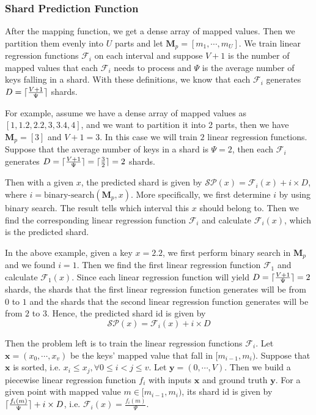 \subsubsection{Shard Prediction Function}

After the mapping function, we get a dense array of mapped values. Then we partition them evenly into $U$ parts and let $\boldsymbol{M}_p=[m_1,\cdots, m_U]$. We train linear regression functions $\mathcal{F}_i$ on each interval and suppose $V+1$ is the number of mapped values that each $\mathcal{F}_i$ needs to process and $\Psi$ is the average number of keys falling in a shard. With these definitions, we know that each $\mathcal{F}_i$ generates $D=\lceil\frac{V+1}{\Psi}\rceil$ shards.

For example, assume we have a dense array of mapped values as $[1,1.2,2.2,3,3.4,4]$, and we want to partition it into 2 parts, then we have $\boldsymbol{M}_p=[3]$ and $V+1=3$. In this case we will train $2$ linear regression functions. Suppose that the average number of keys in a shard is $\Psi=2$, then each $\mathcal{F}_i$ generates $D=\lceil\frac{V+1}{\Psi}\rceil=\lceil\frac{3}{2}\rceil=2$ shards.

Then with a given $x$, the predicted shard is given by $\mathcal{SP}(x)=\mathcal{F}_i(x)+i\times D$, where $i=\text{binary-search}(\boldsymbol{M}_p,x)$. More specifically, we first determine $i$ by using binary search. The result tells which interval this $x$ should belong to. Then we find the corresponding linear regression function $\mathcal{F}_i$ and calculate $\mathcal{F}_i(x)$, which is the predicted shard.

In the above example, given a key $x=2.2$, we first perform binary search in $\boldsymbol{M}_p$ and we found $i=1$. Then we find the first linear regression function $\mathcal{F}_1$ and calculate $\mathcal{F}_1(x)$. Since each linear regression function will yield $D=\lceil\frac{V+1}{\Psi}\rceil=2$ shards, the shards that the first linear regression function generates will be from $0$ to $1$ and the shards that the second linear regression function generates will be from $2$ to $3$. Hence, the predicted shard id is given by 
$$
\mathcal{SP}(x)=\mathcal{F}_i(x)+i\times D
$$

Then the problem left is to train the linear regression functions $\mathcal{F}_i$. Let $\boldsymbol{x}=(x_0,\cdots,x_v)$ be the keys' mapped value that fall in $[m_{i-1}, m_i)$. Suppose that $\boldsymbol{x}$ is sorted, i.e. $x_i\leq x_j, \forall 0\leq i<j\leq v$. Let $\boldsymbol{y}=(0,\cdots, V)$. Then we build a piecewise linear regression function $f_i$ with inputs $\boldsymbol{x}$ and ground truth $\boldsymbol{y}$. For a given point with mapped value $m\in[m_{i-1}, m_i)$, its shard id is given by $\lceil\frac{f_i(m)}{\Psi}\rceil+i\times D$, i.e. $\mathcal{F}_i(x)=\frac{f_i(m)}{\Psi}$.


